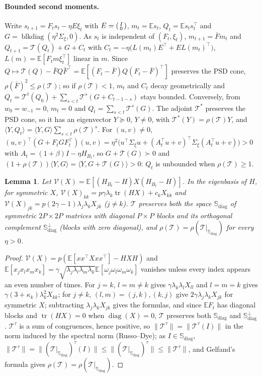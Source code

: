 \documentclass[11pt]{article}
\newtheorem{lemma}[theorem]{Lemma}
\newcommand{\E}{\mathbb{E}}
\newcommand{\tr}{\operatorname{tr}}
\newcommand{\T}{\mathcal T}
\newcommand{\V}{\mathcal V}
\begin{document}
\paragraph{Bounded second moments.} Write $s_{t+1}=F_ts_t-\eta E\xi_t$ with $E=\begin{psmallmatrix}I\\0\end{psmallmatrix}$, $m_t=\E s_t$, $Q_t=\E s_ts_t^\top$ and $G=\operatorname{blkdiag}(\eta^2\Sigma_\xi,0)$. As $s_t$ is independent of $(F_t,\xi_t)$, $m_{t+1}=\bar Fm_t$ and $Q_{t+1}=\T(Q_t)+G+C_t$ with $C_t=-\eta\big(L(m_t)E^\top+EL(m_t)^\top\big)$, $L(m)=\E[F_tm\xi_t^\top]$ linear in $m$. Since $Q\mapsto\T(Q)-\bar FQ\bar F^\top=\E[(F_t-\bar F)Q(F_t-\bar F)^\top]$ preserves the PSD cone, $\rho(\bar F)^2\le\rho(\T)$; so if $\rho(\T)<1$, $m_t$ and $C_t$ decay geometrically and $Q_t=\T^t(Q_0)+\sum_{s<t}\T^s(G+C_{t-1-s})$ stays bounded. Conversely, from $w_0=w_{-1}=0$, $m_t=0$ and $Q_t=\sum_{s<t}\T^s(G)$. The adjoint $\T^*$ preserves the PSD cone, so it has an eigenvector $Y\succeq0$, $Y\ne0$, with $\T^*(Y)=\rho(\T)Y$, and $\langle Y,Q_t\rangle=\langle Y,G\rangle\sum_{s<t}\rho(\T)^s$. For $(u,v)\ne0$, $(u,v)^\top(G+F_tGF_t^\top)(u,v)=\eta^2\big(u^\top\Sigma_\xi u+(A_t^\top u+v)^\top\Sigma_\xi(A_t^\top u+v)\big)>0$ with $A_t=(1+\beta)I-\eta H_{B_t}$, so $G+\T(G)\succ0$ and $(1+\rho(\T))\langle Y,G\rangle=\langle Y,G+\T(G)\rangle>0$: $Q_t$ is unbounded when $\rho(\T)\ge1$.

\begin{lemma}\label{lem:V}
Let $\V(X)=\E[(H_{B_t}-H)X(H_{B_t}-H)]$. In the eigenbasis of $H$, for symmetric $X$, $\V(X)_{kk}=p\gamma\lambda_k\tr(HX)+c_kX_{kk}$ and $\V(X)_{jk}=p(2\gamma-1)\lambda_j\lambda_kX_{jk}$ ($j\ne k$). $\T$ preserves both the space $\mathbb S_{\mathrm{diag}}$ of symmetric $2P\times2P$ matrices with diagonal $P\times P$ blocks and its orthogonal complement $\mathbb S_{\mathrm{diag}}^\perp$ (blocks with zero diagonal), and $\rho(\T)=\rho(\T|_{\mathbb S_{\mathrm{diag}}})$ for every $\eta>0$.
\end{lemma}
\begin{proof}
$\V(X)=p(\E[xx^\top Xxx^\top]-HXH)$ and $\E[x_jx_lx_mx_k]=\gamma\sqrt{\lambda_j\lambda_l\lambda_m\lambda_k}\E[\omega_j\omega_l\omega_m\omega_k]$ vanishes unless every index appears an even number of times. For $j=k$, $l=m\ne k$ gives $\gamma\lambda_k\lambda_lX_{ll}$ and $l=m=k$ gives $\gamma(3+\kappa_k)\lambda_k^2X_{kk}$; for $j\ne k$, $(l,m)=(j,k),(k,j)$ give $2\gamma\lambda_j\lambda_kX_{jk}$ for symmetric $X$; subtracting $\lambda_j\lambda_kX_{jk}$ gives the formulas, and since $\E F_t$ has diagonal blocks and $\tr(HX)=0$ when $\operatorname{diag}(X)=0$, $\T$ preserves both $\mathbb S_{\mathrm{diag}}$ and $\mathbb S_{\mathrm{diag}}^\perp$. $\T^\tau$ is a sum of congruences, hence positive, so $\|\T^\tau\|=\|\T^\tau(I)\|$ in the norm induced by the spectral norm (Russo--Dye); as $I\in\mathbb S_{\mathrm{diag}}$, $\|\T^\tau\|=\|(\T|_{\mathbb S_{\mathrm{diag}}})^\tau(I)\|\le\|(\T|_{\mathbb S_{\mathrm{diag}}})^\tau\|\le\|\T^\tau\|$, and Gelfand's formula gives $\rho(\T)=\rho(\T|_{\mathbb S_{\mathrm{diag}}})$.
\end{proof}
\end{document}
